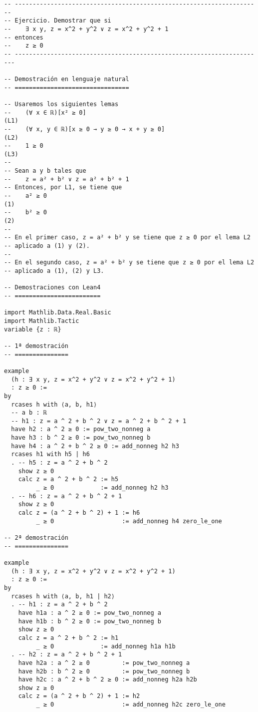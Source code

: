 \begin{verbatim}
-- ---------------------------------------------------------------------
-- Ejercicio. Demostrar que si
--    ∃ x y, z = x^2 + y^2 ∨ z = x^2 + y^2 + 1
-- entonces
--    z ≥ 0
-- ----------------------------------------------------------------------

-- Demostración en lenguaje natural
-- ================================

-- Usaremos los siguientes lemas
--    (∀ x ∈ ℝ)[x² ≥ 0]                                              (L1)
--    (∀ x, y ∈ ℝ)[x ≥ 0 → y ≥ 0 → x + y ≥ 0]                        (L2)
--    1 ≥ 0                                                          (L3)
--
-- Sean a y b tales que
--    z = a² + b² ∨ z = a² + b² + 1
-- Entonces, por L1, se tiene que
--    a² ≥ 0                                                         (1)
--    b² ≥ 0                                                         (2)
--
-- En el primer caso, z = a² + b² y se tiene que z ≥ 0 por el lema L2
-- aplicado a (1) y (2).
--
-- En el segundo caso, z = a² + b² y se tiene que z ≥ 0 por el lema L2
-- aplicado a (1), (2) y L3.

-- Demostraciones con Lean4
-- ========================

import Mathlib.Data.Real.Basic
import Mathlib.Tactic
variable {z : ℝ}

-- 1ª demostración
-- ===============

example
  (h : ∃ x y, z = x^2 + y^2 ∨ z = x^2 + y^2 + 1)
  : z ≥ 0 :=
by
  rcases h with ⟨a, b, h1⟩
  -- a b : ℝ
  -- h1 : z = a ^ 2 + b ^ 2 ∨ z = a ^ 2 + b ^ 2 + 1
  have h2 : a ^ 2 ≥ 0 := pow_two_nonneg a
  have h3 : b ^ 2 ≥ 0 := pow_two_nonneg b
  have h4 : a ^ 2 + b ^ 2 ≥ 0 := add_nonneg h2 h3
  rcases h1 with h5 | h6
  . -- h5 : z = a ^ 2 + b ^ 2
    show z ≥ 0
    calc z = a ^ 2 + b ^ 2 := h5
         _ ≥ 0             := add_nonneg h2 h3
  . -- h6 : z = a ^ 2 + b ^ 2 + 1
    show z ≥ 0
    calc z = (a ^ 2 + b ^ 2) + 1 := h6
         _ ≥ 0                   := add_nonneg h4 zero_le_one

-- 2ª demostración
-- ===============

example
  (h : ∃ x y, z = x^2 + y^2 ∨ z = x^2 + y^2 + 1)
  : z ≥ 0 :=
by
  rcases h with ⟨a, b, h1 | h2⟩
  . -- h1 : z = a ^ 2 + b ^ 2
    have h1a : a ^ 2 ≥ 0 := pow_two_nonneg a
    have h1b : b ^ 2 ≥ 0 := pow_two_nonneg b
    show z ≥ 0
    calc z = a ^ 2 + b ^ 2 := h1
         _ ≥ 0             := add_nonneg h1a h1b
  . -- h2 : z = a ^ 2 + b ^ 2 + 1
    have h2a : a ^ 2 ≥ 0         := pow_two_nonneg a
    have h2b : b ^ 2 ≥ 0         := pow_two_nonneg b
    have h2c : a ^ 2 + b ^ 2 ≥ 0 := add_nonneg h2a h2b
    show z ≥ 0
    calc z = (a ^ 2 + b ^ 2) + 1 := h2
         _ ≥ 0                   := add_nonneg h2c zero_le_one


\end{verbatim}
